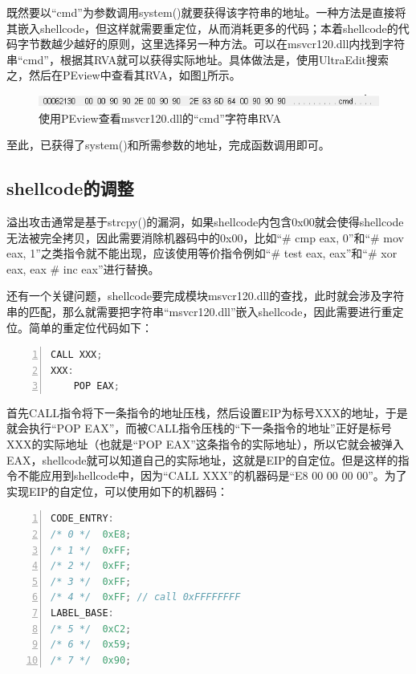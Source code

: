 \documentclass[bachelor]{thesis-uestc}
\begin{document}
既然要以``cmd''为参数调用system()就要获得该字符串的地址。一种方法是直接将其嵌入shellcode，但这样就需要重定位，从而消耗更多的代码；本着shellcode的代码字节数越少越好的原则，这里选择另一种方法。可以在msvcr120.dll内找到字符串``cmd''，根据其RVA就可以获得实际地址。具体做法是，使用UltraEdit搜索之，然后在PEview中查看其RVA，如图\ref{fig:libc_cmd_rva}所示。

\begin{figure}[htbp]
	\centering\includegraphics[width=12cm]{images/libc_cmd_rva.png}
	\caption{使用PEview查看msvcr120.dll的``cmd''字符串RVA}
	\label{fig:libc_cmd_rva}
\end{figure}

至此，已获得了system()和所需参数的地址，完成函数调用即可。

\subsection{shellcode的调整}
溢出攻击通常是基于strcpy()的漏洞，如果shellcode内包含0x00就会使得shellcode无法被完全拷贝，因此需要消除机器码中的0x00，比如``\# cmp eax, 0''和``\# mov eax, 1''之类指令就不能出现，应该使用等价指令例如``\# test eax, eax''和``\# xor eax, eax \# inc eax''进行替换。\par
还有一个关键问题，shellcode要完成模块msvcr120.dll的查找，此时就会涉及字符串的匹配，那么就需要把字符串``msvcr120.dll''嵌入shellcode，因此需要进行重定位。简单的重定位代码如下：

\begin{lstlisting}[language=C++, basicstyle=\ttfamily\tiny, numbers=left, numberstyle=\tiny, keywordstyle=\color{blue!70}, commentstyle=\color{red!50!green!50!blue!50}, frame=shadowbox, rulesepcolor=\color{red!20!green!20!blue!20}]
	CALL XXX;
XXX:
	POP EAX;
\end{lstlisting}

首先CALL指令将下一条指令的地址压栈，然后设置EIP为标号XXX的地址，于是就会执行``POP EAX''，而被CALL指令压栈的``下一条指令的地址''正好是标号XXX的实际地址（也就是``POP EAX''这条指令的实际地址），所以它就会被弹入EAX，shellcode就可以知道自己的实际地址，这就是EIP的自定位。但是这样的指令不能应用到shellcode中，因为``CALL XXX''的机器码是``E8 00 00 00 00''。为了实现EIP的自定位，可以使用如下的机器码：

\begin{lstlisting}[language=C++, basicstyle=\ttfamily\tiny, numbers=left, numberstyle=\tiny, keywordstyle=\color{blue!70}, commentstyle=\color{red!50!green!50!blue!50}, frame=shadowbox, rulesepcolor=\color{red!20!green!20!blue!20}]
CODE_ENTRY:
/* 0 */	 0xE8;
/* 1 */	 0xFF;
/* 2 */	 0xFF;
/* 3 */	 0xFF;
/* 4 */	 0xFF; // call 0xFFFFFFFF
LABEL_BASE:
/* 5 */	 0xC2;
/* 6 */	 0x59;
/* 7 */	 0x90;
\end{lstlisting}
\end{document}

